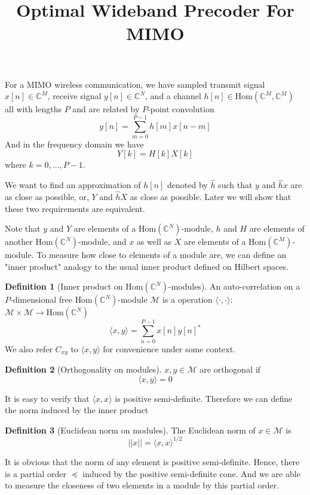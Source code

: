 \documentclass[12pt]{article}
\title{Optimal Wideband Precoder For MIMO}
\theoremstyle{definition}
\newtheorem{definition}{Definition}
\begin{document}
\maketitle
For a MIMO wireless communication, we have sampled transmit signal $x[n]\in\mathbb{C}^M$, receive signal $y[n]\in\mathbb{C}^N$, and a channel $h[n]\in\mbox{Hom}\left(\mathbb{C}^M, \mathbb{C}^M\right)$ all with lengths $P$ and are related by $P$-point convolution
$$y[n]=\sum_{m=0}^{P-1}h[m]x[n-m]$$
And in the frequency domain we have
$$Y[k]=H[k]X[k]$$
where $k=0,\dots,P-1$.

We want to find an approximation of $h[n]$ denoted by $\hat{h}$ such that $y$ and $\hat{h}x$ are as close as possible, or, $Y$ and $\hat{h}X$ as close as possible. Later we will show that these two requirements are equivalent.

Note that $y$ and $Y$ are elements of a $\mbox{Hom}\left(\mathbb{C}^N \right)$-module, $h$ and $H$ are elements of another $\mbox{Hom}\left(\mathbb{C}^N \right)$-module, and $x$ as well as $X$ are elements of a $\mbox{Hom}\left(\mathbb{C}^M \right)$-module. To measure how close to elements of a module are, we can define an "inner product" analogy to the usual inner product defined on Hilbert spaces.
\begin{definition}[Inner product on $\mbox{Hom}\left(\mathbb{C}^N \right)$-modules]\label{def inner product}
	An auto-correlation on a $P$-dimensional free $\mbox{Hom}\left(\mathbb{C}^N \right)$-module $\mathcal{M}$ is a operation $\langle\cdot,\cdot\rangle$: $\mathcal{M}\times\mathcal{M}\rightarrow\mbox{Hom}\left(\mathbb{C}^N \right)$
	$$\langle x,y\rangle=\sum_{n=0}^{P-1}x[n]y[n]^*$$
	We also refer $C_{xy}$ to $\langle x,y\rangle$ for convenience under some context.
\end{definition}
\begin{definition}[Orthogonality on modules]\label{def orthogonality}
	$x,y\in\mathcal{M}$ are orthogonal if
	$$\langle x,y\rangle=0$$
\end{definition}
It is easy to verify that $\langle x,x\rangle$ is positive semi-definite. Therefore we can define the norm induced by the inner product
\begin{definition}[Euclidean norm on modules]\label{def norm}
	The Euclidean norm of $x\in\mathcal{M}$ is 
	$$||x||=\langle x,x\rangle^{1/2}$$
\end{definition}
It is obvious that the norm of any element is positive semi-definite. Hence, there is a partial order $\preceq$ induced by the positive semi-definite cone. And we are able to measure the closeness of two elements in a module by this partial order.
\end{document}
